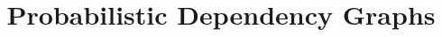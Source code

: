 \documentclass{article}
\title{Probabilistic Dependency Graphs}
\author{} %
\theoremstyle{plain}
\theoremstyle{definition}
\theoremstyle{remark}
\numberwithin{equation}{section}
\begin{document}
	\maketitle
	\begin{abstract}

\end{abstract}
\end{document}
